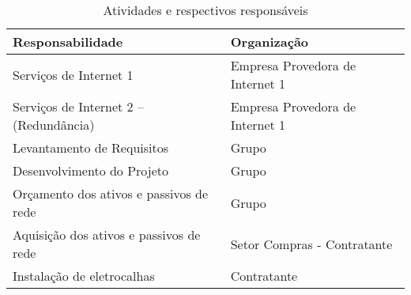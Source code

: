 \begin{table}[h!] %
	\centering
	\caption{Atividades e respectivos responsáveis}
	\label{tab3}
	\begin{tabular}{|l|l|}
		\hline
		\textbf{Responsabilidade} & \textbf{Organização} \\ \hline
		Serviços de Internet 1 & Empresa Provedora de Internet 1 \\ \hline
		Serviços de Internet 2 – (Redundância) & Empresa Provedora de Internet 1 \\ \hline
		Levantamento de Requisitos & Grupo \\ \hline
		Desenvolvimento do Projeto & Grupo \\ \hline
		Orçamento dos ativos e passivos de rede & Grupo \\ \hline
		Aquisição dos ativos e passivos de rede & Setor Compras - Contratante \\ \hline
		Instalação de eletrocalhas & Contratante \\ \hline
	\end{tabular}
\end{table}